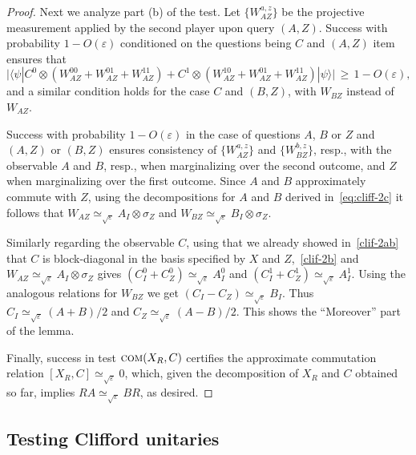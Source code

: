 \documentclass{toc}
\newcommand{\ket}[1]{|#1\rangle}
\newcommand{\bra}[1]{\langle#1|}
\newcommand{\eps}{\varepsilon}
\newcommand{\comt}{\textsc{com}}
\begin{document}
\begin{proof}
Next we analyze part (b) of the test. Let $\{W_{AZ}^{a,z}\}$ be the projective measurement applied by the second player upon query $(A,Z)$. Success with probability $1-O(\eps)$ conditioned on the questions being $C$ and $(A,Z)$ item ensures that 
\begin{equation}\label{clif-2b}
\big| \bra{\psi} C^0 \otimes (W_{AZ}^{00} + W_{AZ}^{01} + W_{AZ}^{11}) + C^1\otimes (W_{AZ}^{10} + W_{AZ}^{01} + W_{AZ}^{11}) \ket{\psi} \big| \,\geq\,1-O(\eps),
\end{equation}
and a similar condition holds for the case $C$ and $(B,Z)$, with $W_{BZ}$ instead of $W_{AZ}$. 

Success with probability $1-O(\eps)$ in the case of questions $A$, $B$ or $Z$ and $(A,Z)$ or $(B,Z)$ %
ensures consistency of $\{W_{AZ}^{a,z}\}$
%
and $\{W_{BZ}^{b,z}\}$, resp., %
with the observable $A$ %
and $B$, resp., 
when marginalizing over the second outcome, 
and $Z$ when marginalizing over the first outcome.  Since
%
%
$A$ and $B$   %
approximately commute
with $Z$,  %
using the decompositions for $A$ and $B$ derived in~\eqref{eq:cliff-2c} it follows that $W_{AZ} \simeq_{\sqrt{\eps}} A_I \otimes \sigma_Z$ and $W_{BZ} \simeq_{\sqrt{\eps}} B_I \otimes \sigma_Z$. 

Similarly regarding the observable $C$, using that we already showed in~\eqref{clif-2ab} that $C$ is block-diagonal in the basis specified by $X$ and $Z$,~\eqref{clif-2b} and $W_{AZ} \simeq_{\sqrt{\eps}} A_I \otimes \sigma_Z$ gives $(C_I^0 + C_Z^0) \simeq_{\sqrt{\eps}} A_I^0$ and $(C_I^1 + C_Z^1) \simeq_{\sqrt{\eps}} A_I^1$. Using the analogous relations for $W_{BZ}$ we get $(C_I - C_Z) \simeq_{\sqrt{\eps}} B_I$. Thus $C_I \simeq_{\sqrt{\eps}} (A+B)/2$ and $C_Z \simeq_{\sqrt{\eps}} (A-B)/2$. This shows the ``Moreover'' part of the lemma. 

Finally, success in test $\comt(X_R,C)$ certifies the approximate commutation relation $[X_R,C]\simeq_{\sqrt{\eps}} 0$, which, given the decomposition of $X_R$ and $C$ obtained so far, implies $RA \simeq_{\sqrt{\eps}} B R$, as desired. 
\end{proof}



\subsection{Testing Clifford unitaries}
\label{sec:n-clifford}
\end{document}
